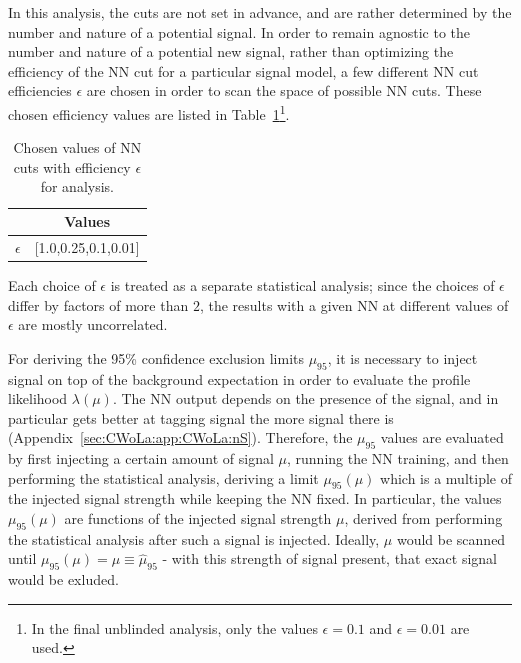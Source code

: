 In this analysis, the cuts are not set in advance, and are rather determined by the number and nature of a potential signal.
In order to remain agnostic to the number and nature of a potential new signal, rather than optimizing the efficiency of the NN cut for a particular signal model, a few different NN cut efficiencies $\epsilon$ are chosen in order to scan the space of possible NN cuts.
These chosen efficiency values are listed in Table~\ref{tab:effs}\footnote{In the final unblinded analysis, only the values $\epsilon=0.1$ and $\epsilon=0.01$ are used.}.
\begin{table}[htb]
  \centering
  \caption{Chosen values of NN cuts with efficiency $\epsilon$ for analysis.}
  \label{tab:effs}
  \begin{tabular}{c c}
    \hline
 & Values   \\ \hline
$\epsilon$ & [1.0,0.25,0.1,0.01] \\
    \hline
  \end{tabular}
\end{table}
Each choice of $\epsilon$ is treated as a separate statistical analysis; since the choices of $\epsilon$ differ by factors of more than $2$, the results with a given NN at different values of $\epsilon$ are mostly uncorrelated.

For deriving the 95\% confidence exclusion limits $\mu_{95}$, it is necessary to inject signal on top of the background expectation in order to evaluate the profile likelihood $\lambda(\mu)$.
The NN output depends on the presence of the signal, and in particular gets better at tagging signal the more signal there is (Appendix~\ref{sec:CWoLa:app:CWoLa:nS}). 
Therefore, the $\mu_{95}$ values are evaluated by first injecting a certain amount of signal $\mu$, running the NN training, and then performing the statistical analysis, deriving a limit $\mu_{95}(\mu)$ which is a multiple of the injected signal strength while keeping the NN fixed. 
In particular, the values $\mu_{95}(\mu)$ are functions of the injected signal strength $\mu$, derived from performing the statistical analysis after such a signal is injected.
Ideally, $\mu$ would be scanned until $\mu_{95}(\mu)=\mu\equiv\hat{\mu}_{95}$ - with this strength of signal present, that exact signal would be exluded.

